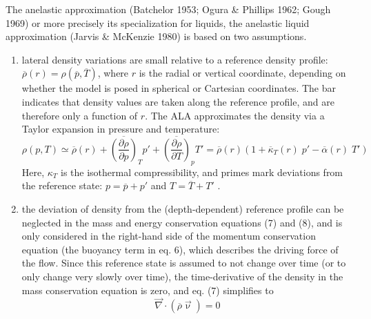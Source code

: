 \documentclass[a4paper,11pt]{article}
\begin{document}
\begin{displayquote}{\color{darkgray}
The anelastic approximation (Batchelor 1953; Ogura \& Phillips
1962; Gough 1969) or more precisely its specialization for liquids,
the anelastic liquid approximation (Jarvis \& McKenzie 1980) is
based on two assumptions.

\begin{enumerate}
\item lateral density variations are
small relative to a reference density profile: $\overline{\rho}(r) = \rho(\overline{p},\overline{T})$, where $r$ is the radial or vertical coordinate, depending on whether the model
is posed in spherical or Cartesian coordinates. The bar indicates
that density values are taken along the reference profile, and are
therefore only a function of $r$. The ALA approximates the density
via a Taylor expansion in pressure and temperature:
\[
\rho(p,T) \simeq \overline{\rho}(r) + 
\overline{\left( \frac{\partial \rho}{\partial p} \right)}_T p' +
\overline{\left( \frac{\partial \rho}{\partial T} \right)}_p T' 
=\overline{\rho}(r) \left( 1 +\overline{\kappa}_T(r) \; p' -\overline{\alpha}(r) \; T'  \right)
\]
Here, $\kappa_T$ is the isothermal compressibility, and primes mark deviations from the reference state: $p=\overline{p} + p'$  and $T=\overline{T} + T'$ .

\item the deviation of density from the
(depth-dependent) reference profile can be neglected in the mass and
energy conservation equations (7) and (8), and is only considered
in the right-hand side of the momentum conservation equation (the
buoyancy term in eq. 6), which describes the driving force of the
flow. Since this reference state is assumed to not change over time
(or to only change very slowly over time), the time-derivative of
the density in the mass conservation equation is zero, and eq. (7)
simplifies to
\[
\vec\nabla \cdot (\overline{\rho} \vec\upnu ) = 0
\]

\end{enumerate}

}
\end{displayquote}
\end{document}

